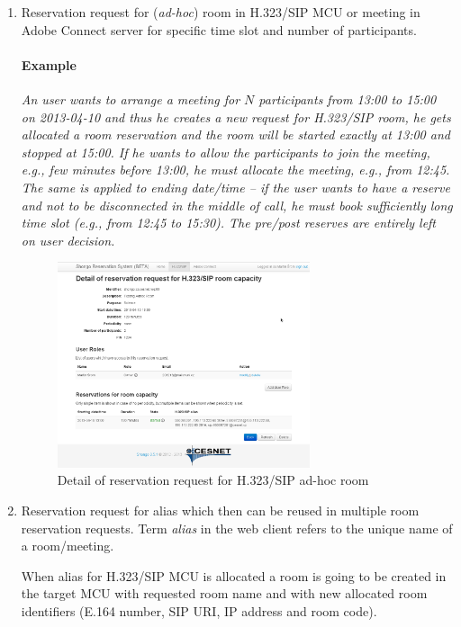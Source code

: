 \begin{enumerate}
\item Reservation request for (\textit{ad-hoc}) room in H.323/SIP MCU or meeting in Adobe Connect server for specific time slot and number of participants. 
\paragraph{Example}
\textit{An user wants to arrange a meeting for $N$ participants from 13:00 to 15:00 on 2013-04-10 and thus he creates a new request for H.323/SIP room, he gets allocated a room reservation and the room will be started exactly at 13:00 and stopped at 15:00. If he wants to allow the participants to join the meeting, e.g., few minutes before 13:00, he must allocate the meeting, e.g., from 12:45. The same is applied to ending date/time -- if the user wants to have a reserve and not to be disconnected in the middle of call, he must book sufficiently long time slot (e.g., from 12:45 to 15:30). The pre/post reserves are entirely left on user decision.}

\begin{figure}[ht!]
\centering\includegraphics[width=0.7\textwidth]{images/client_web_detail_room.png}
\caption{Detail of reservation request for H.323/SIP ad-hoc room}
\label{fig:client-web-detail-room}
\end{figure}

\item Reservation request for alias which then can be reused in multiple room reservation requests. Term \textit{alias} in the web client refers to the unique name of a room/meeting.

When alias for H.323/SIP MCU is allocated a room is going to be created in the target MCU with requested room name and with new allocated room identifiers (E.164 number, SIP URI, IP address and room code).


\end{enumerate}
